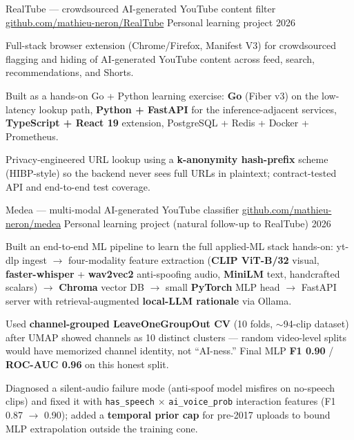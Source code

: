\documentclass[11pt, letterpaper]{awesome-cv}
\begin{document}
\newpage

\begin{cventries}

  \cventry
    {RealTube --- crowdsourced AI-generated YouTube content filter}
    {\href{https://github.com/mathieu-neron/RealTube}{github.com/mathieu-neron/RealTube}}
    {Personal learning project}
    {2026}
    {
      \begin{cvitems}
        \item {Full-stack browser extension (Chrome/Firefox, Manifest V3) for crowdsourced flagging and hiding of AI-generated YouTube content across feed, search, recommendations, and Shorts.}
        \item {Built as a hands-on Go + Python learning exercise: \textbf{Go} (Fiber v3) on the low-latency lookup path, \textbf{Python + FastAPI} for the inference-adjacent services, \textbf{TypeScript + React 19} extension, PostgreSQL + Redis + Docker + Prometheus.}
        \item {Privacy-engineered URL lookup using a \textbf{k-anonymity hash-prefix} scheme (HIBP-style) so the backend never sees full URLs in plaintext; contract-tested API and end-to-end test coverage.}
      \end{cvitems}
    }

  \cventry
    {Medea --- multi-modal AI-generated YouTube classifier}
    {\href{https://github.com/mathieu-neron/medea}{github.com/mathieu-neron/medea}}
    {Personal learning project (natural follow-up to RealTube)}
    {2026}
    {
      \begin{cvitems}
        \item {Built an end-to-end ML pipeline to learn the full applied-ML stack hands-on: yt-dlp ingest $\rightarrow$ four-modality feature extraction (\textbf{CLIP ViT-B/32} visual, \textbf{faster-whisper} + \textbf{wav2vec2} anti-spoofing audio, \textbf{MiniLM} text, handcrafted scalars) $\rightarrow$ \textbf{Chroma} vector DB $\rightarrow$ small \textbf{PyTorch} MLP head $\rightarrow$ FastAPI server with retrieval-augmented \textbf{local-LLM rationale} via Ollama.}
        \item {Used \textbf{channel-grouped LeaveOneGroupOut CV} (10 folds, $\sim$94-clip dataset) after UMAP showed channels as 10 distinct clusters --- random video-level splits would have memorized channel identity, not ``AI-ness.'' Final MLP \textbf{F1 0.90} / \textbf{ROC-AUC 0.96} on this honest split.}
        \item {Diagnosed a silent-audio failure mode (anti-spoof model misfires on no-speech clips) and fixed it with \texttt{has\_speech} $\times$ \texttt{ai\_voice\_prob} interaction features (F1 0.87 $\rightarrow$ 0.90); added a \textbf{temporal prior cap} for pre-2017 uploads to bound MLP extrapolation outside the training cone.}
      \end{cvitems}
    }

\end{cventries}
\end{document}
